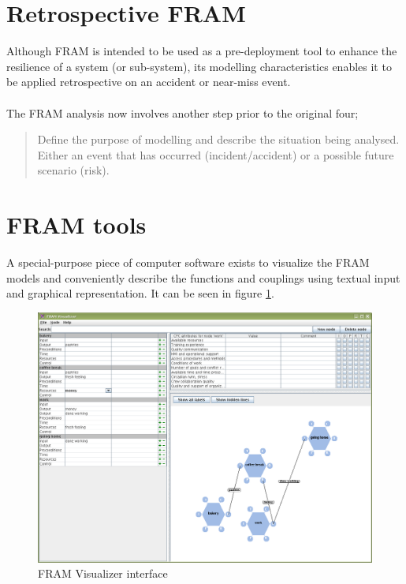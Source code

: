 \documentclass[10pt,oneside]{book}                  %
\begin{document}
\section{Retrospective FRAM}
Although FRAM is intended to be used as a pre-deployment tool to enhance the resilience of a system (or sub-system), its modelling characteristics enables it to be applied retrospective on an accident or near-miss event.\\
\\
The FRAM analysis now involves another step prior to the original four;
\begin{quote}
Define the purpose of modelling and describe the situation being analysed. Either an event that has occurred (incident/accident) or a possible future scenario (risk).
\end{quote}

\section{FRAM tools}
A special-purpose piece of computer software exists to visualize the FRAM models and conveniently describe the functions and couplings using textual input and graphical representation. It can be seen in figure \ref{fig:fram_visualizer_interface}.

\begin{figure}
 \centering
   \includegraphics[width=320pt]{figures/framvisualizer1.png}
 \caption{FRAM Visualizer interface}
 \label{fig:fram_visualizer_interface}
\end{figure}
\end{document}
